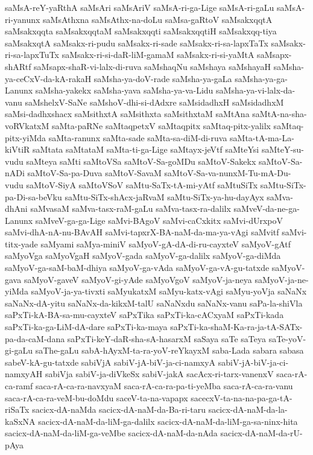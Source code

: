 {saMsA-reY-yaRthA
saMsAri
saMsAriV
saMsA-ri-ga-Lige
saMsA-ri-gaLu
saMsA-ri-yanunx
saMsAthxna
saMsAthx-na-doLu
saMsa-gaRtoV
saMsakxqqtA
saMsakxqqta
saMsakxqqtaM
saMsakxqqti
saMsakxqqtiH
saMsakxqq-tiya
saMsakxqtA
saMsakx-ri-pudu
saMsakx-ri-sade
saMsakx-ri-sa-lapxTaTx
saMsakx-ri-sa-lapxTuTx
saMsakx-ri-si-daR-liM-gamaM
saMsakx-ri-si-yaMtA
saMsapx-shARtf
saMsapx-shaR-vi-lalx-di-ruva
saMshaqNu
saMshaya
saMshayaH
saMsha-ya-ceCxV-da-kA-rakaH
saMsha-ya-doV-rade
saMsha-ya-gaLa
saMsha-ya-ga-Lanunx
saMsha-yakekx
saMsha-yava
saMsha-ya-va-Lidu
saMsha-ya-vi-lalx-da-vanu
saMshelxV-SaNe
saMshoV-dhi-si-dAdxre
saMsidadhxH
saMsidadhxM
saMsi-dadhxshacx
saMsithxtA
saMsithxta
saMsithxtaM
saMtAna
saMtA-na-sha-voRVkatxM
saMta-paRNe
saMtaqpetxV
saMtaqpitx
saMtaq-pitx-yalilx
saMtaq-pitx-yiMda
saMta-ranunx
saMta-sade
saMta-sa-diM-di-ruva
saMta-tA-ma-La-kiVtiR
saMtata
saMtataM
saMta-ti-ga-Lige
saMtayx-jeVtf
saMteYsi
saMteY-su-vudu
saMteya
saMti
saMtoVSa
saMtoV-Sa-goMDu
saMtoV-Sakekx
saMtoV-Sa-nADi
saMtoV-Sa-pa-Duva
saMtoV-SavaM
saMtoV-Sa-va-nunxM-Tu-mA-Du-vudu
saMtoV-SiyA
saMtoVSoV
saMtu-SaTx-tA-mi-yAtf
saMtuSiTx
saMtu-SiTx-pa-Di-sa-beVku
saMtu-SiTx-shAcx-jaRvaM
saMtu-SiTx-ya-hu-dayAyx
saMva-dhAni
saMvasaM
saMva-tasx-raM-gaLu
saMva-tasx-ra-dalilx
saMveV-da-ne-ga-Lanunx
saMveV-ga-ga-Lige
saMvi-BAgoV
saMvi-caCxkitx
saMvi-dUrxpoV
saMvi-dhA-nA-nu-BAvAH
saMvi-tapxrX-BA-naM-da-ma-ya-vAgi
saMvitf
saMvi-titx-yade
saMyami
saMya-miniV
saMyoV-gA-dA-di-ru-cayxteV
saMyoV-gAtf
saMyoVga
saMyoVgaH
saMyoV-gada
saMyoV-ga-dalilx
saMyoV-ga-diMda
saMyoV-ga-saM-baM-dhiya
saMyoV-ga-vAda
saMyoV-ga-vA-gu-tatxde
saMyoV-gava
saMyoV-gaveV
saMyoV-gi-yAde
saMyoVgoV
saMyoV-ja-neya
saMyoV-ja-ne-yiMda
saMyoV-ja-ya-tivxti
saMyukatxM
saMyu-katx-vAgi
saMyu-yoVja
saNaNx
saNaNx-dA-yitu
saNaNx-da-kikxM-talU
saNaNxdu
saNaNx-vanu
saPa-la-shiVla
saPxTi-kA-BA-sa-mu-cayxteV
saPxTika
saPxTi-ka-cACxyaM
saPxTi-kada
saPxTi-ka-ga-LiM-dA-dare
saPxTi-ka-maya
saPxTi-ka-shaM-Ka-ra-ja-tA-SATx-pa-da-caM-dana
saPxTi-keY-daR-sha-sA-hasarxM
saSaya
saTe
saTeya
saTe-yoV-gi-gaLu
saThe-gaLu
sabA-hAyxM-ta-ra-yoV-reYkayxM
saba-Lada
sabara
sabasa
sabeV-kA-gu-tatxde
sabiVjA
sabiV-jA-biV-ja-ci-namxyA
sabiV-jA-biV-ja-ci-namxyAH
sabiVja
sabiV-ja-diVkeSx
sabiV-jakA
sacAcx-ri-tarx-vanenxV
saca-rA-ca-ramf
saca-rA-ca-ra-navxyaM
saca-rA-ca-ra-pa-ti-yeMba
saca-rA-ca-ra-vanu
saca-rA-ca-ra-veM-bu-doMdu
saceV-ta-na-vapapx
sacecxV-ta-na-na-pa-ga-tA-riSaTx
sacicx-dA-naMda
sacicx-dA-naM-da-Ba-ri-taru
sacicx-dA-naM-da-la-kaSxNA
sacicx-dA-naM-da-liM-ga-dalilx
sacicx-dA-naM-da-liM-ga-sa-ninx-hita
sacicx-dA-naM-da-liM-ga-veMbe
sacicx-dA-naM-da-nAda
sacicx-dA-naM-da-rU-pAya
}
